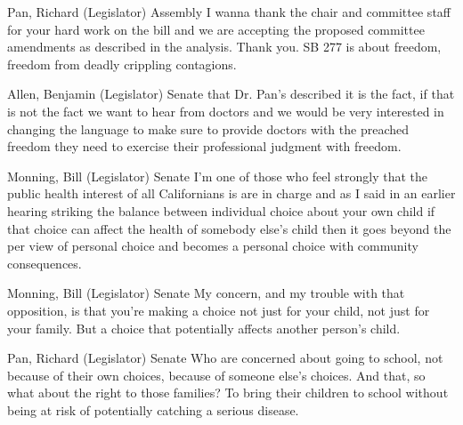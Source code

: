 \begin{result}{5.726798835951455}{Pan, Richard (Legislator) Assembly}
I wanna thank the chair and committee staff for your hard work on the bill and we are accepting the proposed committee amendments as described in the analysis. Thank you. SB 277 is about freedom, freedom from deadly crippling contagions.
\end{result}

\begin{result}{5.482719200641232}{Allen, Benjamin (Legislator) Senate}
that Dr. Pan's described it is the fact, if that is not the fact we want to hear from doctors and we would be very interested in changing the language to make sure to provide doctors with the preached freedom they need to exercise their professional judgment with freedom.
\end{result}

\begin{result}{5.292064184905211}{Monning, Bill (Legislator) Senate}
I'm one of those who feel strongly that the public health interest of all Californians is are in charge and as I said in an earlier hearing striking the balance between individual choice about your own child if that choice can affect the health of somebody else's child then it goes beyond the per view of personal choice and becomes a personal choice with community consequences.
\end{result}

\begin{result}{5.059939486344745}{Monning, Bill (Legislator) Senate}
My concern, and my trouble with that opposition, is that you're making a choice not just for your child, not just for your family. But a choice that potentially affects another person's child.
\end{result}

\begin{result}{4.629013488515942}{Pan, Richard (Legislator) Senate}
Who are concerned about going to school, not because of their own choices, because of someone else's choices. And that, so what about the right to those families? To bring their children to school without being at risk of potentially catching a serious disease.
\end{result}

